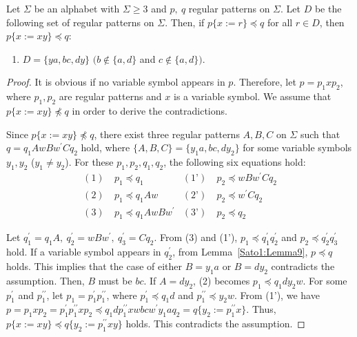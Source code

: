 
\begin{lem}\label{追加部分}
  Let $\Sigma$ be an alphabet with $\Sigma \ge 3$ and $p,~q$ regular patterns on $\Sigma$.
  Let $D$ be the following set of regular patterns on $\Sigma$.
  Then, if $p \{ x := r \} \preceq q$ for all $r \in D$, then $p \{ x := xy \} \preceq q$:
  \begin{enumerate}
  \item[] $D = \{ ya, bc, dy \}$ $(b \not\in \{a,d\}$ and $c \not\in \{a,d\})$.
  \end{enumerate}
\end{lem}

  \begin{proof}
  It is obvious if no variable symbol appears in $p$.
  Therefore, let $p=p_{1}xp_{2}$, where $p_{1}, p_{2}$ are regular patterns and $x$ is a variable symbol.
  We assume that $p \{ x := xy \} \not \preceq q$ in order to derive the contradictions.

  Since $p \{ x := xy \} \not \preceq q$, there exist three regular patterns $A,B,C$ on $\Sigma$ such that $q=q_{1}AwBw^{\prime}Cq_{2}$ hold, where $\{ A,B,C \} = \{ y_{1}a,bc,dy_{2} \}$ for some variable symbols $y_{1}, y_{2}$ ($y_{1} \not= y_{2}$).
  For these $p_{1},p_{2},q_{1},q_{2}$, the following six equations hold:
  \begin{align*}
  (1)~& p_{1} \preceq q_{1} & (\text{1'})~& p_{2} \preceq wBw^{\prime}Cq_{2} \\
  (2)~& p_{1} \preceq q_{1}Aw & (\text{2'})~& p_{2} \preceq w^{\prime}Cq_{2} \\
  (3)~& p_{1} \preceq q_{1}AwBw^{\prime} & (\text{3'})~& p_{2} \preceq q_{2}
  \end{align*}
  
  Let $q^{\prime}_{1}=q_{1}A,~q^{\prime}_{2}=wBw^{\prime},~q^{\prime}_{3}=Cq_{2}$.
  From (3) and (1'), $p_{1} \preceq q^{\prime}_{1}q^{\prime}_{2}$ and $p_{2} \preceq q^{\prime}_{2}q^{\prime}_{3}$ hold.
  If a variable symbol appears in $q^{\prime}_{2}$, from Lemma~\ref{Sato1:Lemma9}, $p \preceq q$ holds.
  This implies that the case of either $B=y_{1}a$ or $B=dy_{2}$ contradicts the assumption.
  Then, $B$ must be $bc$.
  If $A=dy_{2}$,
  (2) becomes $p_{1} \preceq q_{1}dy_{2}w$.
  For some $p^{\prime}_{1}$ and $p^{\prime\prime}_{1}$, let $p_{1}=p^{\prime}_{1}p^{\prime\prime}_{1}$, where $p^{\prime}_{1} \preceq q_{1}d$ and $p^{\prime\prime}_{1} \preceq y_{2}w$. 
  From (1'), we have $p=p_{1}xp_{2}=p^{\prime}_{1}p^{\prime\prime}_{1}xp_{2} \preceq q_{1}dp^{\prime\prime}_{1}xwbcw^{\prime}y_{1}aq_{2}=q \{ y_{2}:=p^{\prime\prime}_{1}x \}$.
  Thus, $p \{ x := xy \} \preceq q \{ y_{2}:=p^{\prime\prime}_{1}xy \}$ holds. This contradicts the assumption.


\end{proof}
